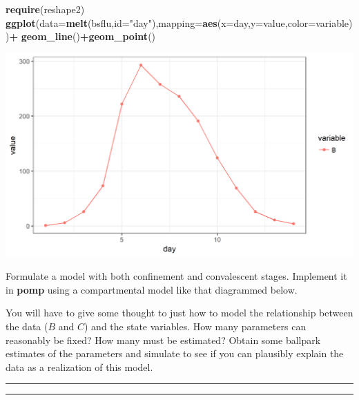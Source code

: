 \documentclass[]{article}
\newenvironment{Shaded}{\begin{snugshade}}{\end{snugshade}}
\newcommand{\KeywordTok}[1]{\textcolor[rgb]{0.13,0.29,0.53}{\textbf{#1}}}
\newcommand{\DataTypeTok}[1]{\textcolor[rgb]{0.13,0.29,0.53}{#1}}
\newcommand{\StringTok}[1]{\textcolor[rgb]{0.31,0.60,0.02}{#1}}
\newcommand{\OperatorTok}[1]{\textcolor[rgb]{0.81,0.36,0.00}{\textbf{#1}}}
\newcommand{\NormalTok}[1]{#1}
\begin{document}
\begin{Shaded}
\begin{Highlighting}[]
\KeywordTok{require}\NormalTok{(reshape2)}
\KeywordTok{ggplot}\NormalTok{(}\DataTypeTok{data=}\KeywordTok{melt}\NormalTok{(bsflu,}\DataTypeTok{id=}\StringTok{"day"}\NormalTok{),}\DataTypeTok{mapping=}\KeywordTok{aes}\NormalTok{(}\DataTypeTok{x=}\NormalTok{day,}\DataTypeTok{y=}\NormalTok{value,}\DataTypeTok{color=}\NormalTok{variable))}\OperatorTok{+}
\StringTok{  }\KeywordTok{geom_line}\NormalTok{()}\OperatorTok{+}\KeywordTok{geom_point}\NormalTok{()}
\end{Highlighting}
\end{Shaded}

\begin{center}\includegraphics{figure/notes11-bsflu-plot2-1} \end{center}

Formulate a model with both confinement and convalescent stages.
Implement it in \textbf{pomp} using a compartmental model like that
diagrammed below.

\hypertarget{htmlwidget-fcce0d5c6205a6196b75}{}

You will have to give some thought to just how to model the relationship
between the data (\(B\) and \(C\)) and the state variables. How many
parameters can reasonably be fixed? How many must be estimated? Obtain
some ballpark estimates of the parameters and simulate to see if you can
plausibly explain the data as a realization of this model.

\begin{center}\rule{0.5\linewidth}{\linethickness}\end{center}

\begin{center}\rule{0.5\linewidth}{\linethickness}\end{center}
\end{document}
